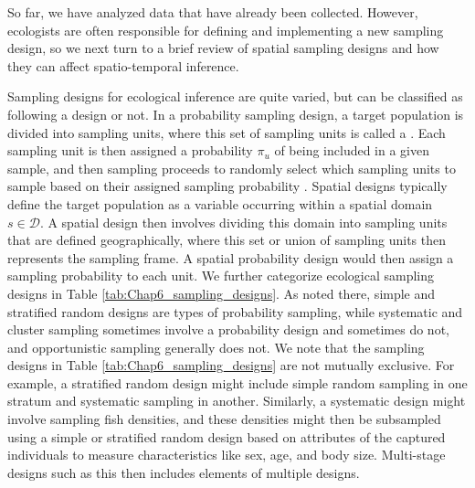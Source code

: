 So far, we have analyzed data that have already been collected.  However, ecologists are often responsible for defining and implementing a new sampling design, so we next turn to a brief review of spatial sampling designs and how they can affect spatio-temporal inference.

Sampling designs for ecological inference are quite varied, but can be classified as following a  design or not.  In a probability sampling design, a target population is divided into sampling units, where this set of sampling units is called a .  Each sampling unit is then assigned a probability \( \pi_u \) of being included in a given sample, and then sampling proceeds to randomly select which sampling units to sample based on their assigned sampling probability \cite{cochran_sampling_1977}.  Spatial designs typically define the target population as a variable occurring within a spatial domain \(s \in \mathcal{D}\).  A spatial design then involves dividing this domain into sampling units that are defined geographically, where this set or union of sampling units then represents the sampling frame.  A spatial probability design would then assign a sampling probability to each unit.  We further categorize ecological sampling designs in Table \ref{tab:Chap6_sampling_designs}.  As noted there, simple and stratified random designs are types of probability sampling, while systematic and cluster sampling sometimes involve a probability design and sometimes do not, and opportunistic sampling generally does not.  We note that the sampling designs in Table \ref{tab:Chap6_sampling_designs} are not mutually exclusive.  For example, a stratified random design might include simple random sampling in one stratum and systematic sampling in another.  Similarly, a systematic design might involve sampling fish densities, and these densities might then be subsampled using a simple or stratified random design based on attributes of the captured individuals to measure characteristics like sex, age, and body size.  Multi-stage designs such as this then includes elements of multiple designs. 

